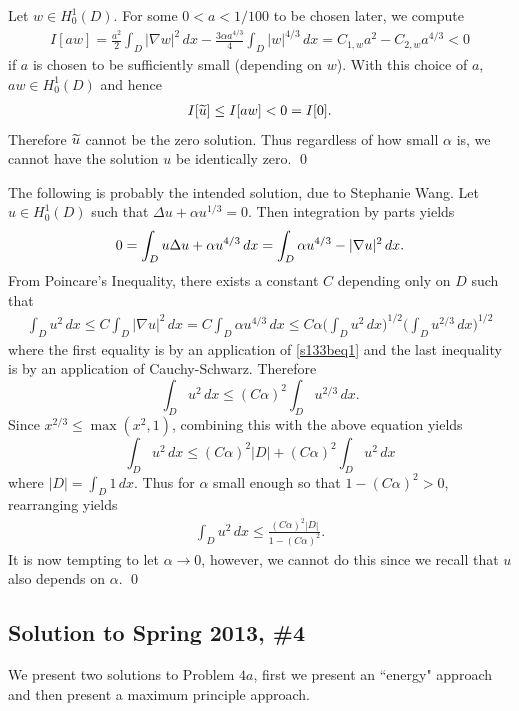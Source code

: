 Let $w \in H_{0}^{1}(D)$. For some $0 < a < 1/100$ to be chosen later, we compute
\begin{align*}
I[aw] = \frac{a^{2}}{2}\int_{D}|\nabla w|^{2}\, dx - \frac{3\alpha a^{4/3}}{4}\int_{D}|w|^{4/3}\, dx = C_{1, w}a^{2} - C_{2, w}a^{4/3} < 0
\end{align*}
if $a$ is chosen to be sufficiently small (depending on $w$). With this choice of $a$, $aw \in H_{0}^{1}(D)$ and hence
\begin{align*}
I[\widetilde{u}] \leq I[aw] < 0 = I[0].
\end{align*}
Therefore $\widetilde{u}$ cannot be the zero solution. Thus regardless of how small $\alpha$ is, we cannot have the solution $u$ be identically zero.
\hfill\qed

\begin{rem}
The following is probably the intended solution, due to Stephanie Wang. Let $u \in H_{0}^{1}(D)$ such that
$\Delta u + \alpha u^{1/3} = 0$. Then integration by parts yields
\begin{align}\label{s133beq1}
0 = \int_{D}u\Delta u + \alpha u^{4/3}\, dx = \int_{D}\alpha u^{4/3} - |\nabla u|^{2}\, dx.
\end{align}
From Poincare's Inequality, there exists a constant $C$ depending only on $D$ such that
\begin{align*}
\int_{D}u^{2}\, dx \leq C\int_{D}|\nabla u|^{2}\, dx = C\int_{D}\alpha u^{4/3}\, dx \leq C\alpha\bigg(\int_{D}u^{2}\, dx\bigg)^{1/2}\bigg(\int_{D}u^{2/3}\, dx \bigg)^{1/2}
\end{align*}
where the first equality is by an application of \eqref{s133beq1} and the last inequality is by an application of
Cauchy-Schwarz.
Therefore
$$\int_{D}u^{2}\, dx \leq (C\alpha)^{2}\int_{D}u^{2/3}\, dx.$$
Since $x^{2/3} \leq \max(x^2, 1)$, combining this with the above equation yields
$$\int_{D}u^{2}\, dx \leq (C\alpha)^{2}|D| + (C\alpha)^{2}\int_{D}u^{2}\, dx$$
where $|D| = \int_{D}1\, dx$.
Thus for $\alpha$ small enough so that $1 - (C\alpha)^{2} > 0$, rearranging yields
\begin{align*}
\int_{D}u^{2}\, dx \leq \frac{(C\alpha)^{2}|D|}{1 - (C\alpha)^{2}}.
\end{align*}
It is now tempting to let $\alpha \rightarrow 0$, however, we cannot do this since we recall that $u$ also depends on $\alpha$.
\hfill\qed
\end{rem}

\subsection*{Solution to Spring 2013, \#4}\label{s134}
We present two solutions to Problem $4a$, first we present an ``energy" approach and then present a maximum principle approach.
